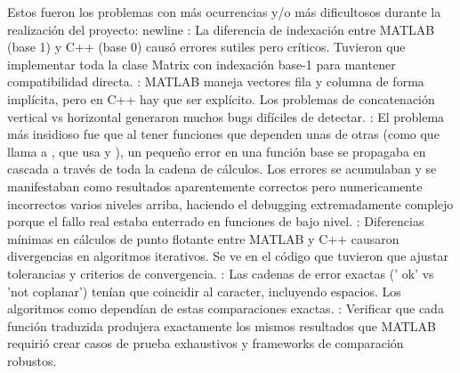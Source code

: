 \markdownRendererDocumentBegin
\markdownRendererSectionBegin
{}\markdownRendererInterblockSeparator
{}Estos fueron los problemas con más ocurrencias y/o más dificultosos durante la realización del proyecto:\markdownRendererInterblockSeparator
{}\markdownRendererBackslash{}newline\markdownRendererInterblockSeparator
{}: La diferencia de indexación entre MATLAB (base 1) y C++ (base 0) causó errores sutiles pero críticos. Tuvieron que implementar toda la clase Matrix con indexación base-1 para mantener compatibilidad directa.\markdownRendererInterblockSeparator
{}: MATLAB maneja vectores fila y columna de forma implícita, pero en C++ hay que ser explícito. Los problemas de concatenación vertical vs horizontal generaron muchos bugs difíciles de detectar.\markdownRendererInterblockSeparator
{}: El problema más insidioso fue que al tener funciones que dependen unas de otras (como  que llama a , que usa  y ), un pequeño error en una función base se propagaba en cascada a través de toda la cadena de cálculos. Los errores se acumulaban y se manifestaban como resultados aparentemente correctos pero numericamente incorrectos varios niveles arriba, haciendo el debugging extremadamente complejo porque el fallo real estaba enterrado en funciones de bajo nivel.\markdownRendererInterblockSeparator
{}: Diferencias mínimas en cálculos de punto flotante entre MATLAB y C++ causaron divergencias en algoritmos iterativos. Se ve en el código que tuvieron que ajustar tolerancias y criterios de convergencia.\markdownRendererInterblockSeparator
{}: Las cadenas de error exactas (' ok' vs 'not coplanar') tenían que coincidir al caracter, incluyendo espacios. Los algoritmos como  dependían de estas comparaciones exactas.\markdownRendererInterblockSeparator
{}: Verificar que cada función traduzida produjera exactamente los mismos resultados que MATLAB requirió crear casos de prueba exhaustivos y frameworks de comparación robustos.
\markdownRendererSectionEnd \markdownRendererDocumentEnd